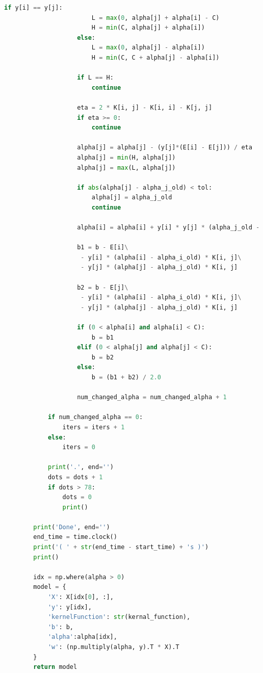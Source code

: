 \documentclass[UTF-8, a4paper, 10pt]{article}
\numberwithin{equation}{section}
\begin{document}
\begin{lstlisting}[language=python]
                    if y[i] == y[j]:
                        L = max(0, alpha[j] + alpha[i] - C)
                        H = min(C, alpha[j] + alpha[i])
                    else:
                        L = max(0, alpha[j] - alpha[i])
                        H = min(C, C + alpha[j] - alpha[i])

                    if L == H:
                        continue

                    eta = 2 * K[i, j] - K[i, i] - K[j, j]
                    if eta >= 0:
                        continue

                    alpha[j] = alpha[j] - (y[j]*(E[i] - E[j])) / eta
                    alpha[j] = min(H, alpha[j])
                    alpha[j] = max(L, alpha[j])

                    if abs(alpha[j] - alpha_j_old) < tol:
                        alpha[j] = alpha_j_old
                        continue

                    alpha[i] = alpha[i] + y[i] * y[j] * (alpha_j_old - alpha[j])

                    b1 = b - E[i]\
                     - y[i] * (alpha[i] - alpha_i_old) * K[i, j]\
                     - y[j] * (alpha[j] - alpha_j_old) * K[i, j]

                    b2 = b - E[j]\
                     - y[i] * (alpha[i] - alpha_i_old) * K[i, j]\
                     - y[j] * (alpha[j] - alpha_j_old) * K[i, j]

                    if (0 < alpha[i] and alpha[i] < C):
                        b = b1
                    elif (0 < alpha[j] and alpha[j] < C):
                        b = b2
                    else:
                        b = (b1 + b2) / 2.0

                    num_changed_alpha = num_changed_alpha + 1

            if num_changed_alpha == 0:
                iters = iters + 1
            else:
                iters = 0

            print('.', end='')
            dots = dots + 1
            if dots > 78:
                dots = 0
                print()

        print('Done', end='')
        end_time = time.clock()
        print('( ' + str(end_time - start_time) + 's )')
        print()

        idx = np.where(alpha > 0)
        model = {
            'X': X[idx[0], :],
            'y': y[idx],
            'kernelFunction': str(kernal_function),
            'b': b,
            'alpha':alpha[idx],
            'w': (np.multiply(alpha, y).T * X).T
        }
        return model


\end{lstlisting}
\end{document}
